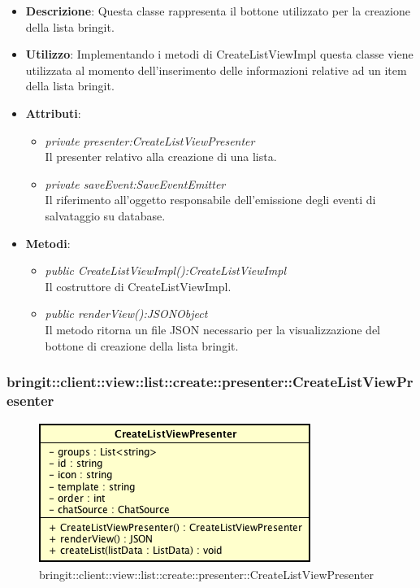 \begin{itemize}
\item \textbf{Descrizione}: Questa classe rappresenta il bottone utilizzato per la creazione della lista bringit.
\item \textbf{Utilizzo}: Implementando i metodi di CreateListViewImpl questa classe viene utilizzata al momento dell'inserimento delle informazioni relative ad un item della lista bringit.
\item \textbf{Attributi}: 
\begin{itemize}
	\item \textit{private presenter:CreateListViewPresenter}\\
	Il presenter relativo alla creazione di una lista.
	\item \textit{private saveEvent:SaveEventEmitter}\\
	Il riferimento all'oggetto responsabile dell'emissione degli eventi di salvataggio su database.
\end{itemize}
\item \textbf{Metodi}:
	\begin{itemize}
	\item \textit{public CreateListViewImpl():CreateListViewImpl}\\
	Il costruttore di CreateListViewImpl.
	\item \textit{public renderView():JSONObject}\\
	Il metodo ritorna un file JSON necessario per la visualizzazione del bottone di creazione della lista bringit.
	\end{itemize}
\end{itemize} 

\subsubsection{bringit::client::view::list::create::presenter::CreateListViewPresenter}

\label{bringit::client::view::list::create::presenter::CreateListViewPresenter}
\begin{figure}[H]
	\centering
	\includegraphics[scale=0.5]{Sezioni/SottosezioniST/img/app/CreateListViewPresenter.png}
	\caption{bringit::client::view::list::create::presenter::CreateListViewPresenter}
\end{figure}

